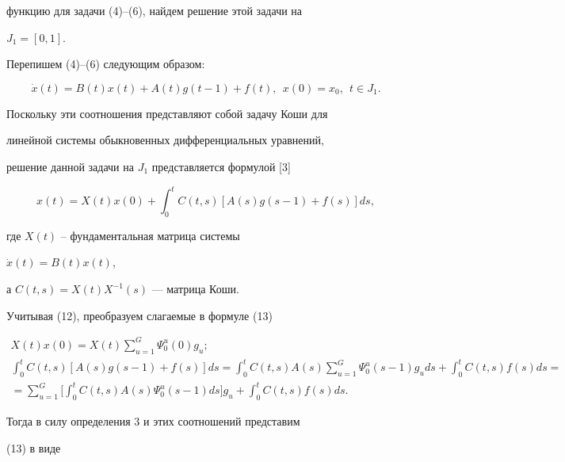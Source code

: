 функцию для задачи (4)--(6), найдем решение этой задачи на


$J_1=[0,1]$.





Перепишем (4)--(6) следующим образом:


$$


\Dot{x}(t)=B(t)x(t)+A(t)g(t-1)+f(t),\ \ x(0)=x_0,\ \ t\in J_1.


$$


Поскольку эти соотношения представляют собой задачу Коши для


линейной системы обыкновенных дифференциальных уравнений,


решение данной задачи на $J_1$ представляется формулой [3]


\begin{equation}


x(t)=X(t)x(0)+\int_{0}^{t}C(t,s)[A(s)g(s-1)+f(s)]ds,


\end{equation}


где $X(t)$ -- фундаментальная матрица системы


$\Dot{x}(t)=B(t)x(t)$,


а $C(t,s)=X(t)X^{-1}(s)$ --- матрица Коши.





Учитывая (12), преобразуем слагаемые в формуле (13)


\begin{gather*}


X(t)x(0)=X(t)\sum_{u=1}^{G}\Psi_{0}^{u}(0)g_u;\\


%


\int_{0}^{t}C(t,s)[A(s)g(s-1)+f(s)]ds= 


\int_{0}^{t}C(t,s)A(s)\sum_{u=1}^{G}\Psi_{0}^u(s-1)g_uds+


\int_{0}^{t}C(t,s)f(s)ds= \\


%


=\sum_{u=1}^{G}\bigg[\int_{0}^{t}C(t,s)A(s)\Psi_{0}^{u}(s-1)ds\bigg]g_u+


\int_{0}^{t}C(t,s)f(s)ds.


\end{gather*}


Тогда в силу определения 3 и этих соотношений представим


(13) в виде


$$


